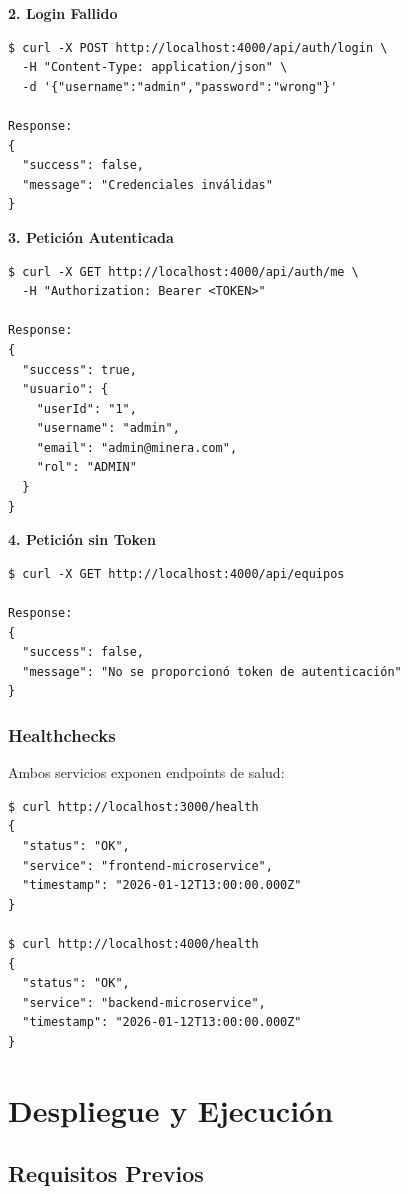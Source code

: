\documentclass[12pt,a4paper]{article}
\begin{document}
\textbf{2. Login Fallido}
\begin{verbatim}
$ curl -X POST http://localhost:4000/api/auth/login \
  -H "Content-Type: application/json" \
  -d '{"username":"admin","password":"wrong"}'

Response:
{
  "success": false,
  "message": "Credenciales inválidas"
}
\end{verbatim}

\textbf{3. Petición Autenticada}
\begin{verbatim}
$ curl -X GET http://localhost:4000/api/auth/me \
  -H "Authorization: Bearer <TOKEN>"

Response:
{
  "success": true,
  "usuario": {
    "userId": "1",
    "username": "admin",
    "email": "admin@minera.com",
    "rol": "ADMIN"
  }
}
\end{verbatim}

\textbf{4. Petición sin Token}
\begin{verbatim}
$ curl -X GET http://localhost:4000/api/equipos

Response:
{
  "success": false,
  "message": "No se proporcionó token de autenticación"
}
\end{verbatim}

\subsubsection{Healthchecks}

Ambos servicios exponen endpoints de salud:

\begin{verbatim}
$ curl http://localhost:3000/health
{
  "status": "OK",
  "service": "frontend-microservice",
  "timestamp": "2026-01-12T13:00:00.000Z"
}

$ curl http://localhost:4000/health
{
  "status": "OK",
  "service": "backend-microservice",
  "timestamp": "2026-01-12T13:00:00.000Z"
}
\end{verbatim}

\newpage

\section{Despliegue y Ejecución}

\subsection{Requisitos Previos}
\end{document}
